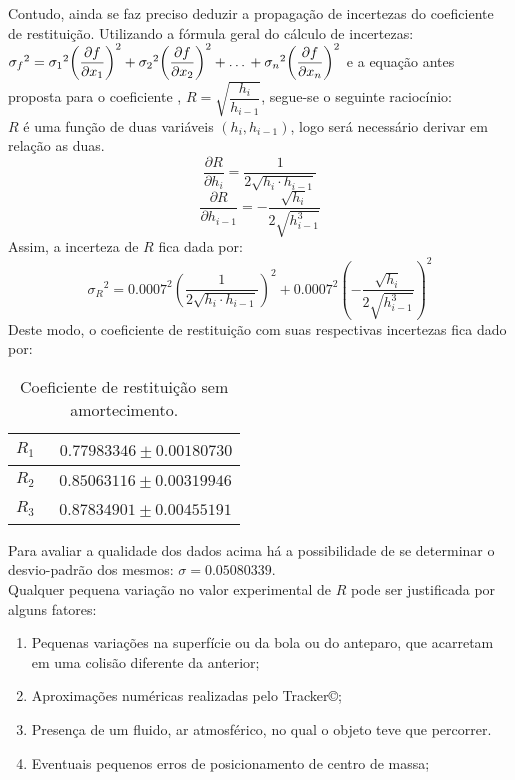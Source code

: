 \documentclass[a4paper, 12pt]{article}
\begin{document}
		\noindent Contudo, ainda se faz preciso deduzir a propagação de incertezas do coeficiente de restituição. Utilizando a fórmula geral do cálculo de incertezas: ${\sigma_f}^2 = {\sigma_1}^2{\left( \dfrac{\partial f}{\partial x_1} \right)}^2+{\sigma_2}^2{\left( \dfrac{\partial f}{\partial x_2} \right)}^2+ \hdots \\ + {\sigma_n}^2{\left( \dfrac{\partial f}{\partial x_n} \right)}^2$ e a equação antes proposta para o coeficiente , $R= \sqrt{\dfrac{h_i}{h_{i-1}}}$, segue-se o seguinte raciocínio: \\
		$R$ é uma função de duas variáveis $(h_i,h_{i-1})$, logo será necessário derivar em relação as duas.
		$$\dfrac{\partial R}{\partial h_i} = \dfrac{1}{2\sqrt{h_i \cdot h_{i-1}}}$$
		$$\dfrac{\partial R}{\partial h_{i-1}} = -\dfrac{\sqrt{h_i}}{2\sqrt{h_{i-1}^3}}$$
		Assim, a incerteza de $R$ fica dada por:
		$${\sigma_R}^2 = {0.0007}^2{\left( \dfrac{1}{2\sqrt{h_i \cdot h_{i-1}}} \right) }^2+{0.0007}^2{\left( -\dfrac{\sqrt{h_i}}{2\sqrt{h_{i-1}^3}} \right) }^2$$
		Deste modo, o coeficiente de restituição com suas respectivas incertezas fica dado por:
		\begin{table}[H]
			\centering
			\begin{tabular}{c|c}
				\hline $R_1$ & \ $0.77983346 \pm 0.00180730$ \\
				\hline $R_2$ & \ $0.85063116 \pm 0.00319946$\\
				\hline $R_3$ & \ $0.87834901 \pm 0.00455191$\\
				\hline
			\end{tabular}	
			\caption{Coeficiente de restituição sem amortecimento.}
			\label{tcm}		
		\end{table}
		\noindent Para avaliar a qualidade dos dados acima há a possibilidade de se determinar o desvio-padrão dos mesmos: $\sigma = 0.05080339$. \\
		Qualquer pequena variação no valor experimental de $R$ pode ser justificada por alguns fatores:
		\begin{enumerate}
			\item Pequenas variações na superfície ou da bola ou do anteparo, que acarretam em uma colisão diferente da anterior;
			\item Aproximações numéricas realizadas pelo Tracker\copyright ;
			\item Presença de um fluido, ar atmosférico, no qual o objeto teve que percorrer.
			\item Eventuais pequenos erros de posicionamento de centro de massa;
		\end{enumerate}		
\end{document}
